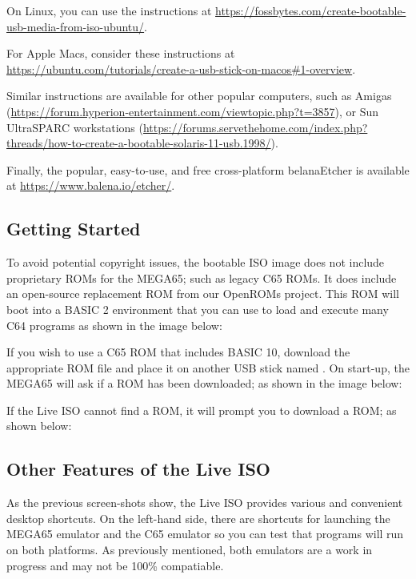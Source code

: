 On Linux, you can use the instructions at \url{https://fossbytes.com/create-bootable-usb-media-from-iso-ubuntu/}.

For Apple Macs, consider these instructions at
\url{https://ubuntu.com/tutorials/create-a-usb-stick-on-macos#1-overview}.

Similar instructions are available for other popular computers, such as Amigas (\url{https://forum.hyperion-entertainment.com/viewtopic.php?t=3857}), or Sun UltraSPARC workstations (\url{https://forums.servethehome.com/index.php?threads/how-to-create-a-bootable-solaris-11-usb.1998/}).

Finally, the popular, easy-to-use, and free cross-platform belanaEtcher is available at \url{https://www.balena.io/etcher/}.

\subsection{Getting Started}

To avoid potential copyright issues, the bootable ISO image does not include proprietary ROMs for the MEGA65; such as legacy C65 ROMs. It does include an open-source replacement ROM from our OpenROMs project. This ROM will boot into a BASIC 2 environment that you can use to load and execute many C64 programs as shown in the image below:


If you wish to use a C65 ROM that includes BASIC 10, download the appropriate ROM file and place it on another USB stick named . On start-up, the MEGA65 will ask if a ROM has been downloaded; as shown in the image below:


If the Live ISO cannot find a ROM, it will prompt you to download a ROM; as shown below:


\subsection{Other Features of the Live ISO}

As the previous screen-shots show, the Live ISO provides various and convenient desktop shortcuts. On the left-hand side, there are shortcuts for launching the
MEGA65 emulator and the C65 emulator so you can test that programs
will run on both platforms. As previously mentioned, both emulators are a work in progress and may not be 100\% compatiable.

